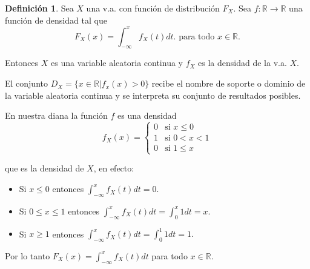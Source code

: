 \documentclass[handout]{beamer}\usepackage[]{graphicx}\usepackage[]{color}
\newcommand{\RR}{\mathbb{R}}
\renewcommand{\leq}{\leqslant}
\renewcommand{\geq}{\geqslant}
\theoremstyle{plain}
\theoremstyle{definition}
\newtheorem{definicion}{Definición}
\begin{document}
\begin{frame}
\begin{definicion}
Sea $X$ una v.a. con función de distribución $F_X$. Sea $f:\RR\to\RR$ una función de
densidad tal que
$$F_X(x)=\int_{-\infty}^{x} f_X(t) dt.\mbox{ para todo } x\in\RR.$$

Entonces $X$ es una variable aleatoria continua y $f_X$ es la densidad de la v.a.  $X$.

El conjunto $D_X=\{x\in\RR| f_x(x)>0\}$ recibe el nombre de soporte o dominio de la
variable aleatoria continua y se interpreta su conjunto de resultados posibles.
\end{definicion}
\end{frame}

\begin{frame}

En nuestra diana la función $f$ es una densidad
$$f_{X}(x)=\left\{
\begin{array}{ll}
0 & \mbox{si } x\leq 0\\
1 & \mbox{si } 0 < x < 1\\
0 & \mbox{si } 1\leq x
\end{array}\right.
$$
\end{frame}

\begin{frame}
que    es la densidad de $X$, en efecto:

\begin{itemize}
\item Si $x \leq 0$ entonces $\int_{-\infty}^x f_X(t) dt = 0.$
\item  Si $0\leq x\leq 1$ entonces $\int_{-\infty}^x f_X(t) dt =
\int_{0}^x 1 dt = x.$
\item Si $x\geq 1$  entonces $\int_{-\infty}^x f_X(t) dt =
\int_{0}^1 1 dt = 1.$
\end{itemize}

Por lo tanto  $F_X(x)=\int_{-\infty}^x f_X(t) dt$ para todo $x\in\RR.$
\end{frame}
\end{document}
